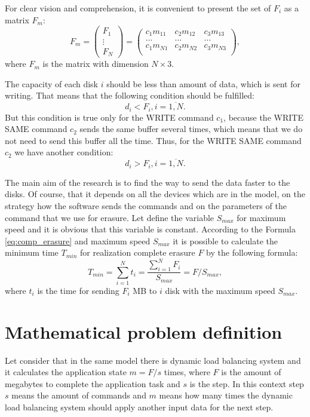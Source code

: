 For clear vision and comprehension, it is convenient to present the set of $F_i$ as a matrix $F_m$:
\begin{equation}
	F_m =
	\begin{pmatrix}
		F_1\\ \vdots\\ F_N 
	\end{pmatrix}
	=
	\begin{pmatrix}
		c_1 m_{11} & c_2 m_{12} & c_3 m_{13} \\
		\ldots & \ldots & \ldots \\
		c_1 m_{N1} & c_2 m_{N2} & c_3 m_{N3} \\
	\end{pmatrix},
\end{equation}
where $F_m$ is the matrix with dimension $N\times3$.

The capacity of each disk $i$ should be less than amount of data, which is sent for writing. That means that the following condition should be fulfilled:
\begin{equation}
	d_i < F_i, i=\overline{1,N}.
\end{equation}
But this condition is true only for the WRITE command $c_1$, because the WRITE SAME command $c_2$ sends the same buffer several times, which means that we do not need to send this buffer all the time. Thus, for the WRITE SAME command $c_2$ we have another condition:
\begin{equation}
	d_i > F_i, i=\overline{1,N}.
\end{equation}

The main aim of the research is to find the way to send the data faster to the disks. Of course, that it depends on all the devices which are in the model, on the strategy how the software sends the commands and on the parameters of the command that we use for erasure. Let define the variable $S_{max}$ for maximum speed and it is obvious that this variable is constant. According to the Formula \ref{eq:comp_erasure} and maximum speed $S_{max}$ it is possible to calculate the minimum time $T_{min}$ for realization complete erasure $F$ by the following formula:
\begin{equation}
\label{eq:time_min}
	T_{min} = \sum_{i=1}^{N}t_i 
			= \frac{\sum_{i=1}^{N}F_i}{S_{max}}
			= F/S_{max},
\end{equation}
where $t_i$ is the time for sending $F_i$ MB to $i$ disk with the maximum speed $S_{max}$. 



\section{Mathematical problem definition}
Let consider that in the same model there is dynamic load balancing system and it calculates the application state $m=F/s$ times, where $F$ is the amount of megabytes to complete the application task and $s$ is the step. In this context step $s$ means the amount of commands and $m$ means how many times the dynamic load balancing system should apply another input data for the next step.

